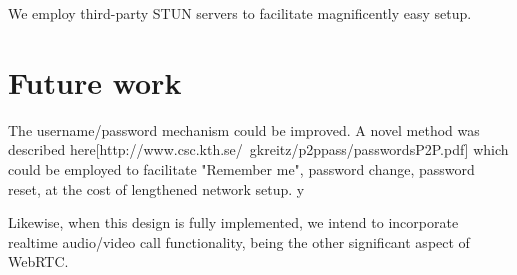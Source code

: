 \documentclass[10pt,a4paper,onecolumn]{article}
\begin{document}
We employ third-party STUN servers to facilitate magnificently easy setup. 

\section{Future work}
The username/password mechanism could be improved. A novel method was described here[http://www.csc.kth.se/~gkreitz/p2ppass/passwordsP2P.pdf] which could be employed to facilitate "Remember me", password change, password reset, at the cost of lengthened network setup. y

Likewise, when this design is fully implemented, we intend to incorporate realtime audio/video call functionality, being the other significant aspect of WebRTC.
\end{document}
